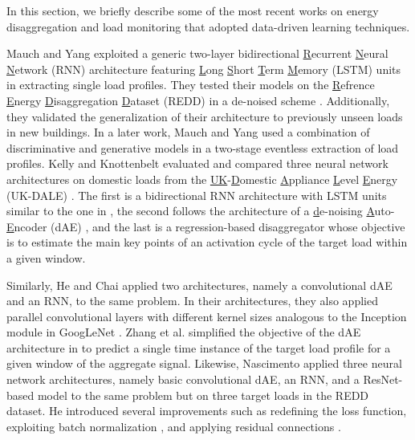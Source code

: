 \documentclass[twocolumn,letter,10pt]{IEEEtran} %
\begin{document}
In this section, we briefly describe some of the most recent works on energy disaggregation and load monitoring that adopted data-driven learning techniques.

Mauch and Yang \cite{Mauch_2015} exploited a generic two-layer bidirectional \underline{R}ecurrent \underline{N}eural \underline{N}etwork (RNN) architecture featuring \underline{L}ong \underline{S}hort \underline{T}erm \underline{M}emory (LSTM) \cite{Hochreiter_1997_LSTM} units in extracting single load profiles. They tested their models on the \underline{R}efrence \underline{E}nergy \underline{D}isaggregation \underline{D}ataset (REDD) \cite{Kolter_2011_REDD} in a de-noised scheme \cite{Makonin_2015_NILMPerformanceEvaluation}. Additionally, they  validated the generalization of their architecture to previously unseen loads in new buildings. In a later work, Mauch and Yang \cite{Mauch_2016} used a combination of discriminative and generative models in a two-stage eventless extraction of load profiles. Kelly and Knottenbelt \cite{Kelly_2015} evaluated and compared three neural network architectures on domestic loads from the \underline{UK}-\underline{D}omestic \underline{A}ppliance \underline{L}evel \underline{E}nergy (UK-DALE) \cite{Kelly_2015_UKDALE}. The first is a bidirectional RNN architecture with LSTM units similar to the one in \cite{Mauch_2015}, the second follows the architecture of a \underline{d}e-noising \underline{A}uto-\underline{E}ncoder (dAE) \cite{Vincent_2010}, and the last is a regression-based disaggregator whose objective is to estimate the main key points of an activation cycle of the target load within a given window. 

Similarly, He and Chai \cite{He_2016_AnEmpiricalStudy} applied two architectures, namely a convolutional dAE and an RNN, to the same problem. In their architectures, they also applied parallel convolutional layers with different kernel sizes analogous to the Inception module in GoogLeNet \cite{Szegedy_2015}. Zhang et al. \cite{Zhang_2016_SequenceToPointLearning} simplified the objective of the dAE architecture in \cite{Kelly_2015} to predict a single time instance of the target load profile for a given window of the aggregate signal.
Likewise, Nascimento \cite{Nascimento_2016} applied three neural network architectures, namely basic convolutional dAE, an RNN, and a ResNet-based model \cite{He_2015_ResNet} to the same problem but on three target loads in the REDD dataset. He introduced several improvements such as redefining the loss function, exploiting batch normalization \cite{Ioffe_2015_BatchNormalization}, and applying residual connections \cite{He_2015_ResNet}.
\end{document}
